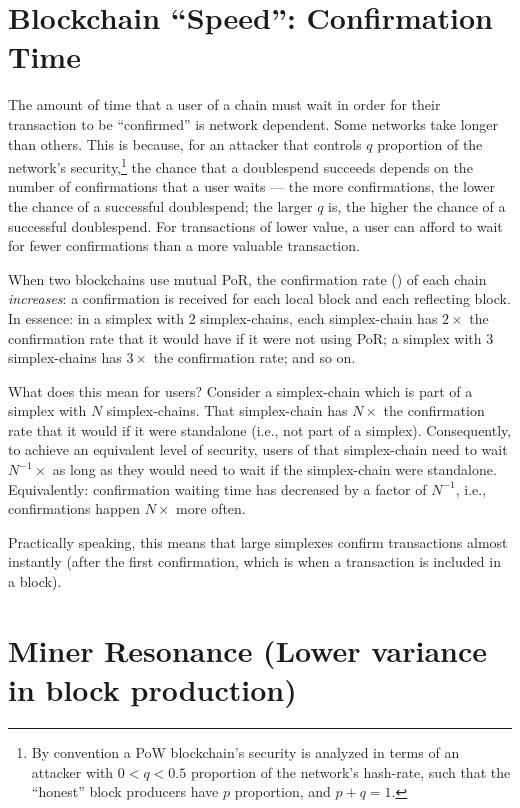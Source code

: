 \documentclass[a4paper,]{article}
\begin{document}
\section{Blockchain ``Speed'': Confirmation Time}

The amount of time that a user of a chain must wait in order for their transaction to be ``confirmed'' is network dependent.
Some networks take longer than others.
This is because, for an attacker that controls $q$ proportion of the network's security,\footnote{
  By convention a PoW blockchain's security is analyzed in terms of an attacker with $0 < q < 0.5$ proportion of the network's hash-rate, such that the ``honest'' block producers have $p$ proportion, and $p + q = 1$.
} the chance that a doublespend succeeds depends on the number of confirmations that a user waits --- the more confirmations, the lower the chance of a successful doublespend; the larger $q$ is, the higher the chance of a successful doublespend.
For transactions of lower value, a user can afford to wait for fewer confirmations than a more valuable transaction.

When two blockchains use mutual PoR, the confirmation rate (\Cprime) of each chain \emph{increases}: a confirmation is received for each local block and each reflecting block.
In essence: in a simplex with 2 simplex-chains, each simplex-chain has $2\times$ the confirmation rate that it would have if it were not using PoR; a simplex with 3 simplex-chains has $3\times$ the confirmation rate; and so on.

What does this mean for users?
Consider a simplex-chain which is part of a simplex with $N$ simplex-chains.
That simplex-chain has $N\times$ the confirmation rate that it would if it were standalone (i.e., not part of a simplex).
Consequently, to achieve an equivalent level of security, users of that simplex-chain need to wait $N^{-1}\times$ as long as they would need to wait if the simplex-chain were standalone.
Equivalently: confirmation waiting time has decreased by a factor of $N^{-1}$, i.e., confirmations happen $N\times$ more often.

Practically speaking, this means that large simplexes confirm transactions almost instantly (after the first confirmation, which is when a transaction is included in a block).

\section{Miner Resonance (Lower variance in block production)}
\end{document}
